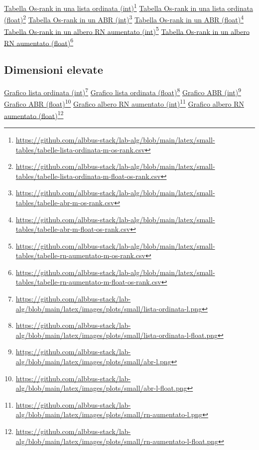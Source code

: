\documentclass[onecolumn]{article}
\newcommand\anchor[2]{%
  \href{#2}{#1}\footnote{\url{#2}}%
}
\begin{document}
\newpage

\noindent
\anchor{Tabella Os-rank in una lista ordinata (int)}{https://github.com/albbus-stack/lab-alg/blob/main/latex/small-tables/tabelle-lista-ordinata-m-os-rank.csv} \label{label:lista-ordinata-m-os-rank}
\newline
\anchor{Tabella Os-rank in una lista ordinata (float)}{https://github.com/albbus-stack/lab-alg/blob/main/latex/small-tables/tabelle-lista-ordinata-m-float-os-rank.csv} \label{label:lista-ordinata-m-float-os-rank}
\newline
\anchor{Tabella Os-rank in un ABR (int)}{https://github.com/albbus-stack/lab-alg/blob/main/latex/small-tables/tabelle-abr-m-os-rank.csv} \label{label:abr-m-os-rank}
\newline
\anchor{Tabella Os-rank in un ABR (float)}{https://github.com/albbus-stack/lab-alg/blob/main/latex/small-tables/tabelle-abr-m-float-os-rank.csv} \label{label:abr-m-float-os-rank}
\newline
\anchor{Tabella Os-rank in un albero RN aumentato (int)}{https://github.com/albbus-stack/lab-alg/blob/main/latex/small-tables/tabelle-rn-aumentato-m-os-rank.csv} \label{label:rn-aumentato-m-os-rank}
\newline
\anchor{Tabella Os-rank in un albero RN aumentato (float)}{https://github.com/albbus-stack/lab-alg/blob/main/latex/small-tables/tabelle-rn-aumentato-m-float-os-rank.csv} \label{label:rn-aumentato-m-float-os-rank}

\newpage
\subsection{Dimensioni elevate}

\anchor{Grafico lista ordinata (int)}{https://github.com/albbus-stack/lab-alg/blob/main/latex/images/plots/small/lista-ordinata-l.png} \label{label:lista-ordinata-l}
\newline
\anchor{Grafico lista ordinata (float)}{https://github.com/albbus-stack/lab-alg/blob/main/latex/images/plots/small/lista-ordinata-l-float.png} \label{label:lista-ordinata-l-float}
\newline
\anchor{Grafico ABR (int)}{https://github.com/albbus-stack/lab-alg/blob/main/latex/images/plots/small/abr-l.png} \label{label:abr-l}
\newline
\anchor{Grafico ABR (float)}{https://github.com/albbus-stack/lab-alg/blob/main/latex/images/plots/small/abr-l-float.png} \label{label:abr-l-float}
\newline
\anchor{Grafico albero RN aumentato (int)}{https://github.com/albbus-stack/lab-alg/blob/main/latex/images/plots/small/rn-aumentato-l.png} \label{label:rn-aumentato-l}
\newline
\anchor{Grafico albero RN aumentato (float)}{https://github.com/albbus-stack/lab-alg/blob/main/latex/images/plots/small/rn-aumentato-l-float.png} \label{label:rn-aumentato-l-float}
\end{document}
